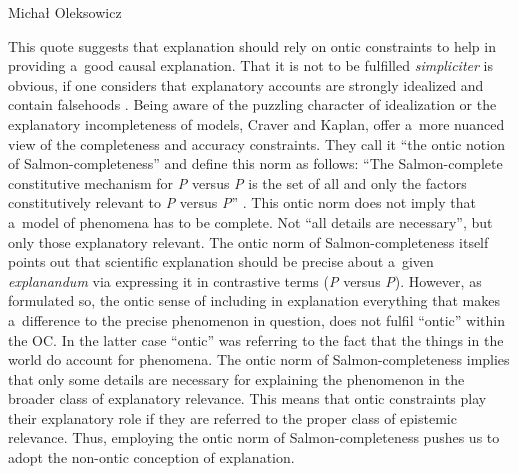 \begin{artengenv}{Michał Oleksowicz}

This quote suggests that explanation should rely on ontic constraints to help in providing a~good causal explanation. That it is not to be fulfilled \textit{simpliciter} is obvious, if one considers that explanatory accounts are strongly idealized and contain falsehoods
\parencite[][]{potochnik_idealization_2017}. %
 Being aware of the puzzling character of idealization or the explanatory incompleteness of models, Craver and Kaplan, offer a~more nuanced view of the completeness and accuracy constraints. They call it ``the ontic notion of Salmon-completeness'' and define this norm as follows: ``The Salmon-complete constitutive mechanism for \textit{P} versus \textit{P{\textasciigrave}} is the set of all and only the factors constitutively relevant to \textit{P} versus \textit{P{\textasciigrave}}'' 
\parencite[][p.300]{craver_are_2020}. %
 This ontic norm does not imply that a~model of phenomena has to be complete. Not ``all details are necessary'', but only those explanatory relevant. The ontic norm of Salmon-completeness itself points out that scientific explanation should be precise about a~given \textit{explanandum} via expressing it in contrastive terms (\textit{P} versus \textit{P{\textasciigrave}}). However, as formulated so, the ontic sense of including in explanation everything that makes a~difference to the precise phenomenon in question, does not fulfil ``ontic'' within the OC. In the latter case ``ontic'' was referring to the fact that the things in the world do account for phenomena. The ontic norm of Salmon-completeness implies that only some details are necessary for explaining the phenomenon in the broader class of explanatory relevance. This means that ontic constraints play their explanatory role if they are referred to the proper class of epistemic relevance. Thus, employing the ontic norm of Salmon-completeness pushes us to adopt the non-ontic conception of explanation.


\end{artengenv}
